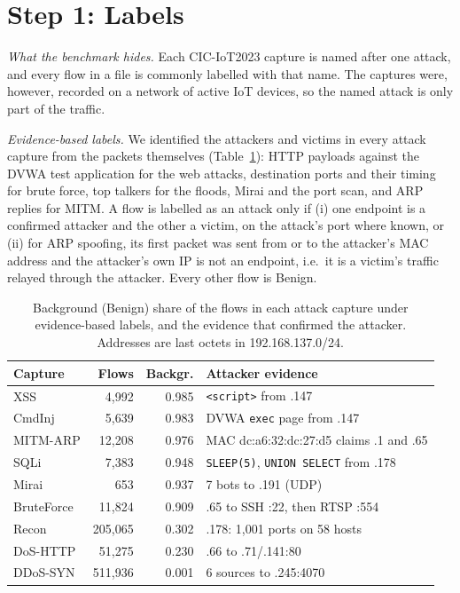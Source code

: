 \section{Step 1: Labels}\label{sec:labels}

\emph{What the benchmark hides.} Each CIC-IoT2023 capture is named after one attack, and every flow in a file is commonly labelled with that name. The captures were, however, recorded on a network of active IoT devices, so the named attack is only part of the traffic.

\emph{Evidence-based labels.} We identified the attackers and victims in every attack capture from the packets themselves (Table~\ref{tab:background}): HTTP payloads against the DVWA test application for the web attacks, destination ports and their timing for brute force, top talkers for the floods, Mirai and the port scan, and ARP replies for MITM. A flow is labelled as an attack only if (i) one endpoint is a confirmed attacker and the other a victim, on the attack's port where known, or (ii) for ARP spoofing, its first packet was sent from or to the attacker's MAC address and the attacker's own IP is not an endpoint, i.e.\ it is a victim's traffic relayed through the attacker. Every other flow is Benign.

\begin{table}[t]
\centering
\caption{Background (Benign) share of the flows in each attack capture under evidence-based labels, and the evidence that confirmed the attacker. Addresses are last octets in 192.168.137.0/24.}
\label{tab:background}
\footnotesize
\setlength{\tabcolsep}{3pt}
\begin{tabular}{lrrp{3.6cm}}
\hline
Capture & Flows & Backgr. & Attacker evidence \\
\hline
XSS          &   4,992 & 0.985 & \texttt{<script>} from .147 \\
CmdInj       &   5,639 & 0.983 & DVWA \texttt{exec} page from .147 \\
MITM-ARP     &  12,208 & 0.976 & MAC dc:a6:32:dc:27:d5 claims .1 and .65 \\
SQLi         &   7,383 & 0.948 & \texttt{SLEEP(5)}, \texttt{UNION SELECT} from .178 \\
Mirai        &     653 & 0.937 & 7 bots to .191 (UDP) \\
BruteForce   &  11,824 & 0.909 & .65 to SSH :22, then RTSP :554 \\
Recon        & 205,065 & 0.302 & .178: 1,001 ports on 58 hosts \\
DoS-HTTP     &  51,275 & 0.230 & .66 to .71/.141:80 \\
DDoS-SYN     & 511,936 & 0.001 & 6 sources to .245:4070 \\
\hline
\end{tabular}
\end{table}

